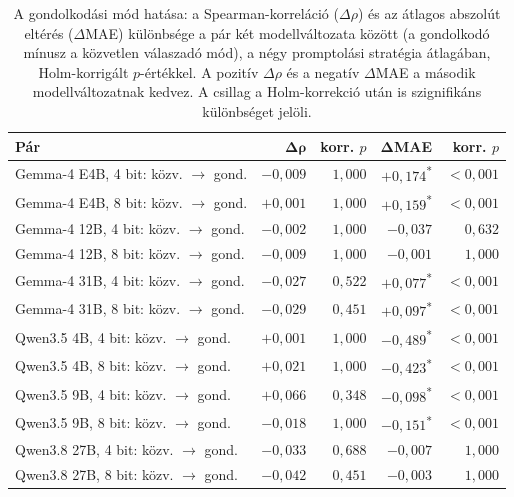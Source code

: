 \documentclass[
]{elteikthesis}[2024/04/26]
\begin{document}
\begin{table}[htbp]
	\centering
	\small
	\setlength{\tabcolsep}{4pt}
	\begin{tabular}{ | l | r | r | r | r | }
		\hline
		\textbf{Pár} & $\boldsymbol{\Delta\rho}$ & \textbf{korr. $p$} & $\boldsymbol{\Delta}$\textbf{MAE} & \textbf{korr. $p$} \\
		\hline \hline
		Gemma-4 E4B, 4 bit: közv. $\rightarrow$ gond. & $-0{,}009$ & $1{,}000$ & $+0{,}174$\textsuperscript{*} & $<0{,}001$ \\
		\hline
		Gemma-4 E4B, 8 bit: közv. $\rightarrow$ gond. & $+0{,}001$ & $1{,}000$ & $+0{,}159$\textsuperscript{*} & $<0{,}001$ \\
		\hline
		Gemma-4 12B, 4 bit: közv. $\rightarrow$ gond. & $-0{,}002$ & $1{,}000$ & $-0{,}037$ & $0{,}632$ \\
		\hline
		Gemma-4 12B, 8 bit: közv. $\rightarrow$ gond. & $-0{,}009$ & $1{,}000$ & $-0{,}001$ & $1{,}000$ \\
		\hline
		Gemma-4 31B, 4 bit: közv. $\rightarrow$ gond. & $-0{,}027$ & $0{,}522$ & $+0{,}077$\textsuperscript{*} & $<0{,}001$ \\
		\hline
		Gemma-4 31B, 8 bit: közv. $\rightarrow$ gond. & $-0{,}029$ & $0{,}451$ & $+0{,}097$\textsuperscript{*} & $<0{,}001$ \\
		\hline
		Qwen3.5 4B, 4 bit: közv. $\rightarrow$ gond. & $+0{,}001$ & $1{,}000$ & $-0{,}489$\textsuperscript{*} & $<0{,}001$ \\
		\hline
		Qwen3.5 4B, 8 bit: közv. $\rightarrow$ gond. & $+0{,}021$ & $1{,}000$ & $-0{,}423$\textsuperscript{*} & $<0{,}001$ \\
		\hline
		Qwen3.5 9B, 4 bit: közv. $\rightarrow$ gond. & $+0{,}066$ & $0{,}348$ & $-0{,}098$\textsuperscript{*} & $<0{,}001$ \\
		\hline
		Qwen3.5 9B, 8 bit: közv. $\rightarrow$ gond. & $-0{,}018$ & $1{,}000$ & $-0{,}151$\textsuperscript{*} & $<0{,}001$ \\
		\hline
		Qwen3.8 27B, 4 bit: közv. $\rightarrow$ gond. & $-0{,}033$ & $0{,}688$ & $-0{,}007$ & $1{,}000$ \\
		\hline
		Qwen3.8 27B, 8 bit: közv. $\rightarrow$ gond. & $-0{,}042$ & $0{,}451$ & $-0{,}003$ & $1{,}000$ \\
		\hline
	\end{tabular}
	\caption[A gondolkodási mód hatása]{A gondolkodási mód hatása: a Spearman-korreláció ($\Delta\rho$) és az átlagos abszolút eltérés
	($\Delta$MAE) különbsége a pár két modellváltozata között (a gondolkodó mínusz a közvetlen válaszadó mód), a négy promptolási
	stratégia átlagában, Holm-korrigált $p$-értékkel. A pozitív $\Delta\rho$ és a negatív $\Delta$MAE a
	második modellváltozatnak kedvez. A csillag a Holm-korrekció után is szignifikáns különbséget jelöli.}
	\label{tab:app:axis:reasoning}
\end{table}
\end{document}
